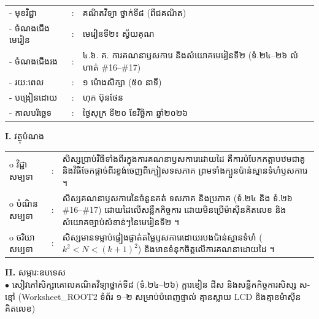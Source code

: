 \documentclass[a4paper,10pt]{article}
\newcommand{\wcirc}{{\CourierBullet\fontsize{9.5pt}{11pt}\selectfont o}}
\newcommand{\en}[1]{{\TimesEn #1}}
\begin{document}
{\renewcommand{\arraystretch}{0.98}
\hspace*{3.1cm}%
\begin{tabular}{@{}l l L{11.0cm}@{}}
  - \hspace{0.35cm} មុខវិជ្ជា & : & គណិតវិទ្យា ថ្នាក់ទី៨ (ពីជគណិត) \\
  - \hspace{0.35cm} ចំណងជើងមេរៀន & : & មេរៀនទី២៖ ស្វ័យគុណ \\
  - \hspace{0.35cm} ចំណងជើងរង & : & ៤.៦. គ. ការគណនាឫសការេ និងសំយោគមេរៀនទី២ (ទំ.២៤–២៦ លំហាត់ \#16–\#17) \\
  - \hspace{0.35cm} រយៈពេល & : & ១ ម៉ោងសិក្សា (៥០ នាទី) \\
  - \hspace{0.35cm} បង្រៀនដោយ & : & ហុក ប៊ុនថែន \\
  - \hspace{0.35cm} កាលបរិច្ឆេទ & : & ថ្ងៃសុក្រ ទី២០ ខែវិច្ឆិកា ឆ្នាំ២០២៦ \\
\end{tabular}

\vspace{2pt}

\textbf{I.} {\muol វត្ថុបំណង}\\[1pt]
\hspace*{0.55cm}%
\begin{tabular}{@{}l l L{14.2cm}@{}}
  \wcirc \hspace{0.25cm} វិជ្ជាសម្បទា & : & សិស្សប្រាប់វិធីទាំងពីរក្នុងការគណនាឫសការេដោយដៃ គឺការបំបែកកត្តាបឋមជាគូ និងវិធីចែកផ្ដាច់ពីរខ្ទង់ចេញពីក្បៀសទសភាគ ព្រមទាំងក្បួនប៉ាន់ស្មានទំហំឫសការេ ។ \\
  \wcirc \hspace{0.25cm} បំណិនសម្បទា & : & សិស្សគណនាឫសការេនៃចំនួនគត់ ទសភាគ និងប្រភាគ (ទំ.២៤ និង ទំ.២៦ \#16–\#17) ដោយដៃលើសន្លឹកកិច្ចការ ដោយមិនប្រើម៉ាស៊ីនគិតលេខ និងសំយោគច្បាប់សំខាន់ៗនៃមេរៀនទី២ ។ \\
  \wcirc \hspace{0.25cm} ចរិយាសម្បទា & : & សិស្សមានទម្លាប់ផ្ទៀងផ្ទាត់តម្លៃឫសការេដោយរបងប៉ាន់ស្មានទំហំ ($k^2 < N < (k+1)^2$) និងមានទំនុកចិត្តលើការគណនាដោយដៃ ។ \\
\end{tabular}

\vspace{2pt}

\textbf{II.} {\muol សម្ភារៈឧបទេស}\\[1pt]
\hspace*{0.55cm}$\bullet$ \hspace{0.35cm} សៀវភៅសិក្សាគោលគណិតវិទ្យាថ្នាក់ទី៨ (ទំ.២៤–២៦) ក្ដារខៀន ដីស និងសន្លឹកកិច្ចការសិស្ស ស-ខ្មៅ (\en{Worksheet\_ROOT2} ទំព័រ ១–២ សម្រាប់បំពេញផ្ទាល់ គ្មានស្លាយ \en{LCD} និងគ្មានម៉ាស៊ីនគិតលេខ)

}
\end{document}
